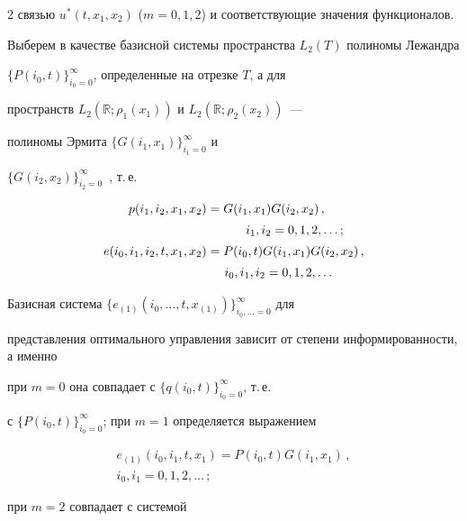 \begin{multicols}{2}
связью $u^*(t,x_1,x_2)$ (${m = 0,1,2}$) и соответствующие значения функционалов.





Выберем в качестве базисной сис\-те\-мы пространства $L_2(T)$ полиномы Лежандра 


$\{P(i_0,t)\}_{i_0=0}^\infty$, определенные на отрезке $T$, а для 


пространств $L_2(\mathbb{R}; \rho_1(x_1))$ и $L_2(\mathbb{R}; \rho_2(x_2))$~--- 


полиномы Эрмита $\{G(i_1,x_1)\}_{i_1=0}^\infty$ и 


$\{G(i_2,x_2)\}_{i_2=0}^\infty$~\cite{SolSem, PanRybSot, PanRyb, Pug, SemRybin, RomRyb}, т.\,е.\


\begin{align*}


    p(i_1,i_2,x_1,x_2) &= G(i_1,x_1)  G(i_2,x_2)\,,\\[2pt]


    &\hspace*{11mm} i_1,i_2 = 0,1,2,\dots; \\[2pt]


    e(i_0,i_1,i_2,t,x_1,x_2) &= P(i_0,t)  G(i_1,x_1)  G(i_2,x_2)\,, \\[2pt]


    &\hspace{5mm} i_0,i_1,i_2 = 0,1,2,\dots


\end{align*}





Базисная сис\-те\-ма ${\{e_{(1)}(i_0,\dots,t,x_{(1)})\}_{i_0,\ldots = 0}^\infty}$ для 


представления оптимального управления зависит от степени информированности, а именно


при ${m = 0}$ она совпадает с $\{q(i_0,t)\}_{i_0=0}^\infty$, т.\,е.\ 


с $\{P(i_0,t)\}_{i_0=0}^\infty$; при ${m = 1}$ определяется выражением


\begin{multline*}


  e_{(1)}(i_0,i_1,t,x_1) = P(i_0,t) G(i_1,x_1)\,, \\


  i_0,i_1 = 0,1,2,\dots\,;


\end{multline*}


при ${m = 2}$ совпадает с сис\-те\-мой 



\end{multicols}
